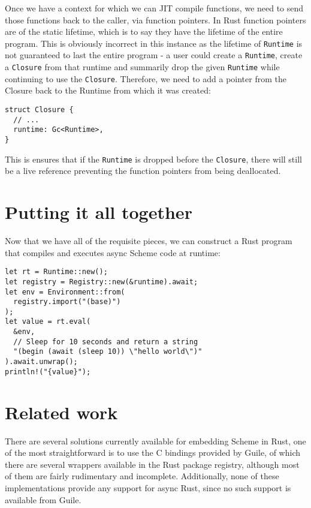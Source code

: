 \documentclass[sigplan,review,anonymous]{acmart}
\begin{document}
Once we have a context for which we can JIT compile functions, we need to send
those functions back to the caller, via function pointers. In Rust function
pointers are of the static lifetime, which is to say they have the lifetime of
the entire program. This is obviously incorrect in this instance as the lifetime
of \texttt{Runtime} is not guaranteed to last the entire program - a user could
create a \texttt{Runtime}, create a \texttt{Closure} from that runtime and
summarily drop the given \texttt{Runtime} while continuing to use the
\texttt{Closure}. Therefore, we need to add a pointer from the Closure back to
the Runtime from which it was created:

\begin{verbatim}
struct Closure {
  // ...
  runtime: Gc<Runtime>,
}
\end{verbatim}

This is ensures that if the \texttt{Runtime} is dropped before the
\texttt{Closure}, there will still be a live reference preventing the function
pointers from being deallocated.

\section{Putting it all together}

Now that we have all of the requisite pieces, we can construct a Rust program
that compiles and executes async Scheme code at runtime:

\begin{verbatim}
let rt = Runtime::new();
let registry = Registry::new(&runtime).await;
let env = Environment::from(
  registry.import("(base)")
);
let value = rt.eval(
  &env,
  // Sleep for 10 seconds and return a string
  "(begin (await (sleep 10)) \"hello world\")"
).await.unwrap();
println!("{value}");
\end{verbatim}

\section{Related work}

There are several solutions currently available for embedding Scheme in Rust,
one of the most straightforward is to use the C bindings provided by Guile, of
which there are several wrappers available in the Rust package registry,
although most of them are fairly rudimentary and incomplete. Additionally, none
of these implementations provide any support for async Rust, since no such
support is available from Guile.
\end{document}
